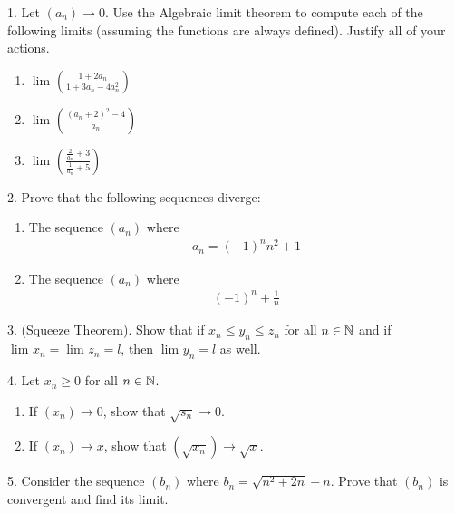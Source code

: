 
1. Let $\left( a_n \right) \to 0$. Use the Algebraic limit theorem to compute each of the following limits (assuming the functions are always defined). Justify all of your actions.

\begin{enumerate}
	\item $\lim_{} \left( \frac{1 + 2a_n}{1 + 3 a_n - 4 a_{n}^{2}} \right) $ 
	\item $\lim_{} \left( \frac{\left( a_n + 2 \right)^{2} - 4}{a_n} \right) $
	\item $\lim_{} \left( \frac{\frac{2}{a_n} + 3}{\frac{1}{a_n} + 5} \right) $
\end{enumerate}
2. Prove that the following sequences diverge:
\begin{enumerate}
	\item The sequence $\left( a_n \right) $ where 
		\begin{align}
			a_n = \left( -1 \right)^{n} n^{2} + 1
		\end{align}
	\item The sequence $\left( a_n \right)$ where
		\begin{align}
			\left( -1 \right)^{n} + \frac{1}{n}
		\end{align}
	\end{enumerate}

3. (Squeeze Theorem). Show that if $x_n \le y_n \le z_n$ for all $n \in \mathbb{N}$ and if $\lim_{} x_n = \lim_{} z_n = l$, then $\lim_{} y_n = l$ as well.

4. Let $x_n \ge 0$ for all $n \in \mathbb{N}$.
\begin{enumerate}
	\item If  $\left( x_n \right) \to 0$, show that $\sqrt{s_n}  \to 0$.
	\item If $\left( x_n \right) \to x$, show that $\left( \sqrt{x_n}  \right) \to \sqrt{x} $.
\end{enumerate}

5. Consider the sequence $\left( b_n \right) $ where $b_n = \sqrt{n^{2} + 2n} - n$. Prove that $\left( b_n \right) $ is convergent and find its limit.

